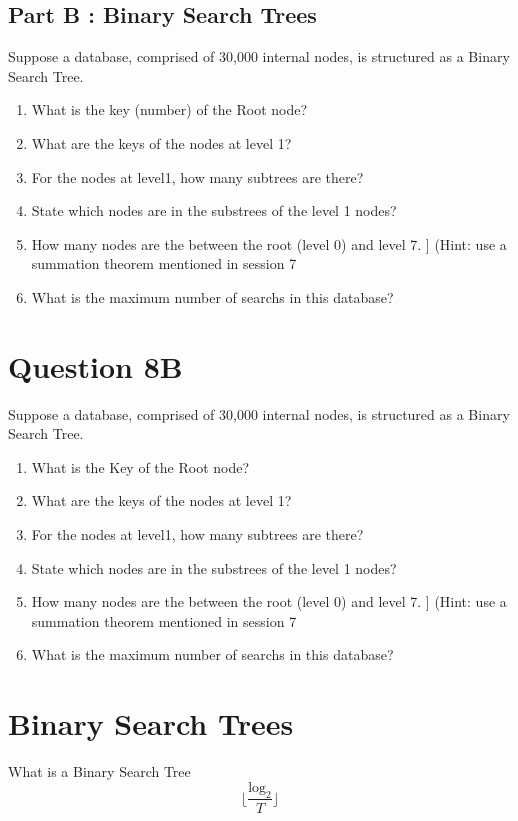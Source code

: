 \documentclass[]{report}
\begin{document}
\subsection*{Part B : Binary Search Trees}
Suppose a database, comprised of 30,000 internal nodes, is structured as a Binary Search Tree.

\begin{enumerate}
\item What is the key (number) of the Root node?
\item What are the keys of the nodes at level 1?
\item For the nodes at level1, how many subtrees are there?
\item State which nodes are in the substrees of the level 1 nodes?
\item How many nodes are the between the root (level 0) and level 7. ]
(Hint: use a summation theorem mentioned in session 7
\item What is the maximum number of searchs in this database?
\end{enumerate}




\section{Question 8B}
Suppose a database, comprised of 30,000 internal nodes, is structured as a Binary Search Tree.

\begin{enumerate}
\item What is the Key of the Root node?
\item What are the keys of the nodes at level 1?
\item For the nodes at level1, how many subtrees are there?
\item State which nodes are in the substrees of the level 1 nodes?
\item How many nodes are the between the root (level 0) and level 7. ]
(Hint: use a summation theorem mentioned in session 7
\item What is the maximum number of searchs in this database?
\end{enumerate}

\section*{Binary Search Trees}
What is a Binary Search Tree
\[ \lfloor  \frac{\mbox{log}_2}{T} \rfloor \]
\end{document}
